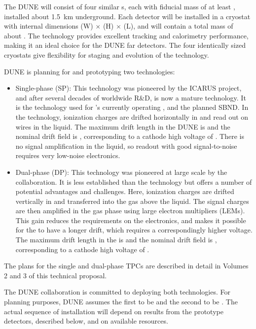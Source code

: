 The DUNE  will consist of four similar \lartpc{}s, each with fiducial mass of at least \nominalmodsize, installed about \SI{1.5}{km} underground. Each detector will be installed in a cryostat with internal dimensions
\cryostatwdth (W) $\times$ \cryostatht (H) $\times$ \cryostatlen (L), and will contain a total \lar{} mass of about \larmass{}.
The \lartpc technology provides
excellent tracking and calorimetry performance, making it an ideal
choice for the DUNE far detectors. The four identically sized cryostats give flexibility for staging and evolution of the \lartpc technology.

DUNE is planning for and prototyping two \lartpc technologies:
\begin{itemize}
\item Single-phase (SP): This technology was pioneered by the ICARUS project, and after several decades of worldwide R\&D, is now a mature technology. It is the technology used for \fnal{}'s currently operating \microboone, and the planned SBND. In the \single technology, ionization charges are drifted horizontally in \lar and read out on wires in the liquid. The maximum drift length in the DUNE  is \spmaxdrift and the nominal drift field is \spmaxfield, corresponding to a cathode high voltage of \sptargetdriftvoltpos. There is no signal amplification in the liquid, so readout with good signal-to-noise requires very low-noise electronics.

\item Dual-phase (DP): This technology was pioneered at large scale by the  collaboration. It is less established than the \single technology but offers a number of potential advantages and challenges. Here, ionization charges are drifted vertically in \lar and transferred into the gas above the liquid. The signal charges are then amplified in the gas phase using large electron multipliers (LEMs). This gain reduces the requirements on the electronics, and makes it possible for the  to have a longer drift, which requires a correspondingly higher voltage.
The maximum drift length in the  is \dpmaxdrift and the nominal drift field is \dpnominaldriftfield, corresponding to a cathode high voltage of \dptargetdriftvoltpos. 

\end{itemize}
The plans for the single and dual-phase TPCs are described in detail in Volumes 2 and 3 of this technical proposal.

The DUNE collaboration is committed to deploying both technologies. 
For planning purposes, DUNE assumes the first  to be
\single and the second to be \dual.
The actual sequence of  installation will depend on results from the prototype detectors, described below, and on available resources.


